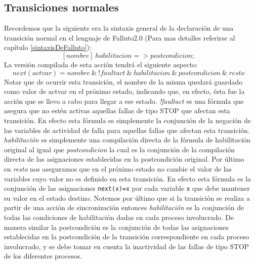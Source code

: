 \documentclass[titlepage, 12pt]{book}
\begin{document}
\subsection*{Transiciones normales}
Recordemos que la siguiente era la sintaxis general de la declaraci\'on de una transici\'on normal en el lenguaje de Falluto2.0 (Para mas detalles referirse al cap\'itulo \ref{sintaxisDeFalluto}):
$$[nombre]~habilitacion => postcondicion;$$
La versi\'on compilada de esta acci\'on tendr\'a el siguiente aspecto:
$$next(actvar)=nombre~\&~!faultact~\&~habilitacion~\&~postcondicion~\&~resto$$
Notar que de ocurrir esta transici\'on, el nombre de la misma quedar\'a guardado como valor de actvar en el pr\'oximo estado, indicando que, en efecto, \'esta fue la acci\'on que se llevo a cabo para llegar a ese estado. \textit{!faultact} es una f\'ormula que asegura que no est\'en activas aquellas fallas de tipo STOP que afectan esta transici\'on. En efecto esta f\'ormula es simplemente la conjunci\'on de la negaci\'on de las variables de actividad de falla para aquellas fallas que afectan esta transici\'on. \textit{habilitaci\'on} es simplemente una compilaci\'on directa de la f\'ormula de habilitaci\'on original al igual que \textit{postcondicion} la cual es la conjunci\'on de la compilaci\'on directa de las asignaciones establecidas en la postcondici\'on original. Por \'ultimo en \textit{resto} nos aseguramos que en el pr\'oximo estado no cambie el valor de las variables cuyo valor no es definido en esta transici\'on. En efecto esta f\'ormula es la conjunci\'on de las asignaciones \texttt{next(x)=x} por cada variable \texttt{x} que debe mantener su valor en el estado destino. Notemos por \'ultimo que si la transici\'on se realiza a partir de una acci\'on de sincronizaci\'on entonces \textit{habilitaci\'on} es la conjunci\'on de todas las condiciones de habilitaci\'on dadas en cada proceso involucrado. De manera similar la postcondici\'on es la conjunci\'on de todas las asignaciones establecidas en la postcondici\'on de la transici\'on correspondiente en cada proceso involucrado, y se debe tomar en cuenta la inactividad de las fallas de tipo STOP de los diferentes procesos.
\end{document}
